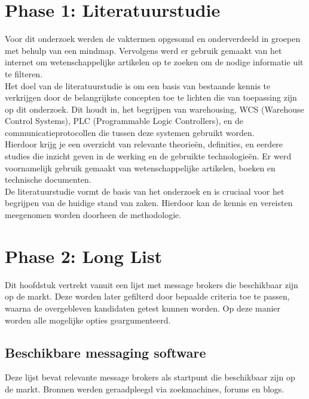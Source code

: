 \section{Phase 1: Literatuurstudie}
Voor dit onderzoek werden de vaktermen opgesomd en onderverdeeld in groepen met behulp van een mindmap.
Vervolgens werd er gebruik gemaakt van het internet om wetenschappelijke artikelen op te zoeken om de nodige informatie uit te filteren.
\\
Het doel van de literatuurstudie is om een basis van bestaande kennis te verkrijgen door de belangrijkste concepten toe te lichten die van toepassing zijn op dit onderzoek. 
Dit houdt in, het begrijpen van warehousing, WCS (Warehouse Control Systems), PLC (Programmable Logic Controllers), en de communicatieprotocollen die tussen deze systemen gebruikt worden.
\\
Hierdoor krijg je een overzicht van relevante theorieën, definities, en eerdere studies die inzicht geven in de werking en de gebruikte technologieën.
Er werd voornamelijk gebruik gemaakt van wetenschappelijke artikelen, boeken en technische documenten.
\\
De literatuurstudie vormt de basis van het onderzoek en is cruciaal voor het begrijpen van de huidige stand van zaken.
Hierdoor kan de kennis en vereisten meegenomen worden doorheen de methodologie.

\section{Phase 2: Long List}
Dit hoofdstuk vertrekt vanuit een lijst met message brokers die beschikbaar zijn op de markt.
Deze worden later gefilterd door bepaalde criteria toe te passen, waarna de overgebleven kandidaten getest kunnen worden.
Op deze manier worden alle mogelijke opties geargumenteerd.

\subsection{Beschikbare messaging software}
Deze lijst bevat relevante message brokers als startpunt die beschikbaar zijn op de markt.
Bronnen werden geraadpleegd via zoekmachines, forums en blogs.

